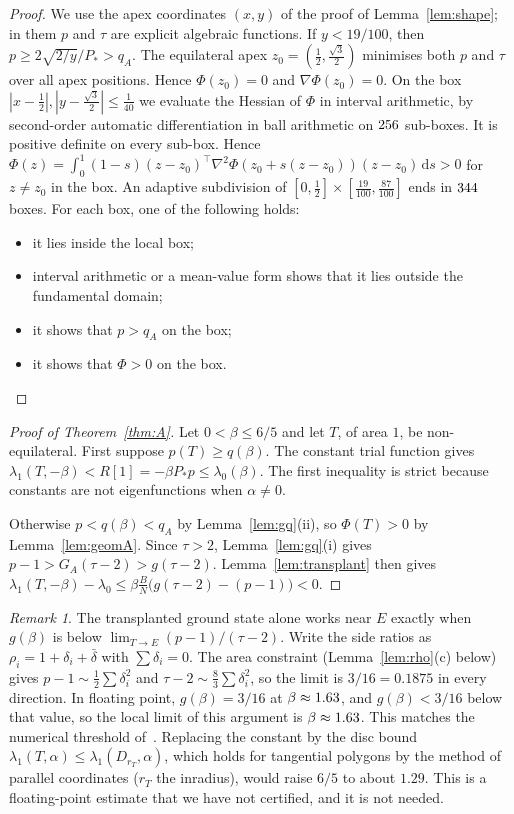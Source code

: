 \documentclass[11pt]{article}
\theoremstyle{remark}
\newtheorem{remark}[theorem]{Remark}
\newcommand{\E}{E}
\newcommand{\dd}{\,\mathrm{d}}
\begin{document}
\begin{proof}
We use the apex coordinates $(x,y)$ of the proof of Lemma~\ref{lem:shape}; in them $p$ and $\tau$ are
explicit algebraic functions. If $y<19/100$, then $p\ge2\sqrt{2/y}/P_*>q_A$. The equilateral apex
$z_0=(\frac12,\frac{\sqrt3}2)$ minimises both $p$ and $\tau$ over all apex positions. Hence
$\Phi(z_0)=0$ and $\nabla\Phi(z_0)=0$. On the box $|x-\frac12|,|y-\frac{\sqrt3}2|\le\frac1{40}$ we evaluate
the Hessian of $\Phi$ in interval arithmetic, by second-order automatic differentiation in ball
arithmetic on $256$ sub-boxes. It is positive definite on every sub-box. Hence
$\Phi(z)=\int_0^1(1-s)(z-z_0)^\top\nabla^2\Phi(z_0+s(z-z_0))(z-z_0)\dd s>0$ for $z\ne z_0$ in the box.
An adaptive subdivision of $[0,\frac12]\times[\frac{19}{100},\frac{87}{100}]$ ends in $344$ boxes.
For each box, one of the following holds:
\begin{itemize}
\item it lies inside the local box;
\item interval arithmetic or a mean-value form shows that it lies outside the fundamental domain;
\item it shows that $p>q_A$ on the box;
\item it shows that $\Phi>0$ on the box.
\end{itemize}
\end{proof}

\begin{proof}[Proof of Theorem~\ref{thm:A}]
Let $0<\beta\le6/5$ and let $T$, of area $1$, be non-equilateral. First suppose $p(T)\ge q(\beta)$. The
constant trial function gives $\lambda_1(T,-\beta)<R[1]=-\beta P_*p\le\lambda_0(\beta)$. The first
inequality is strict because constants are not eigenfunctions when $\alpha\neq0$.

Otherwise $p<q(\beta)<q_A$ by Lemma~\ref{lem:gq}(ii), so $\Phi(T)>0$ by Lemma~\ref{lem:geomA}. Since
$\tau>2$, Lemma~\ref{lem:gq}(i) gives $p-1>G_A(\tau-2)>g(\tau-2)$. Lemma~\ref{lem:transplant} then gives
$\lambda_1(T,-\beta)-\lambda_0\le\beta\frac BN\bigl(g(\tau-2)-(p-1)\bigr)<0$.
\end{proof}

\begin{remark}\label{rem:A}
The transplanted ground state alone works near $\E$ exactly when $g(\beta)$ is below
$\lim_{T\to\E}(p-1)/(\tau-2)$. Write the side ratios as $\rho_i=1+\delta_i+\bar\delta$ with
$\sum\delta_i=0$. The area constraint (Lemma~\ref{lem:rho}(c) below) gives
$p-1\sim\frac12\sum\delta_i^2$ and $\tau-2\sim\frac83\sum\delta_i^2$, so the limit is $3/16=0.1875$ in
every direction. In floating point, $g(\beta)=3/16$ at $\beta\approx1.63$, and $g(\beta)<3/16$
below that value, so the local limit of this argument is $\beta\approx1.63$. This matches the numerical threshold of~\cite{KLV}.
Replacing the constant by the disc bound $\lambda_1(T,\alpha)\le\lambda_1(D_{r_T},\alpha)$, which holds
for tangential polygons by the method of parallel coordinates ($r_T$ the inradius), would raise $6/5$ to
about $1.29$. This is a floating-point estimate that we have not certified, and it is not needed.
\end{remark}
\end{document}
